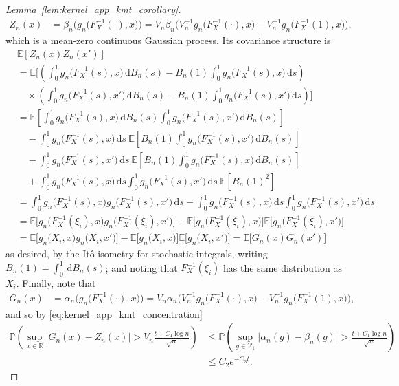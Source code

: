 \documentclass[11pt,lof]{puthesis}
\renewcommand{\P}{\ensuremath{\mathbb{P}}}
\newcommand{\R}{\ensuremath{\mathbb{R}}}
\newcommand{\E}{\ensuremath{\mathbb{E}}}
\newcommand{\cV}{\ensuremath{\mathcal{V}}}
\newcommand{\diff}[1]{\,\mathrm{d}#1}
\theoremstyle{break}
\theoremstyle{proof}
\newtheorem{proof}{Proof}
\begin{document}
\begin{proof}[Lemma~\ref{lem:kernel_app_kmt_corollary}]
\begin{align*}
Z_n(x)
&=
\beta_n \Big(g_n\big(F_X^{-1}(\cdot), x\big)\Big)
= V_n \beta_n \Big(
V_n^{-1} g_n\big(F_X^{-1}(\cdot), x\big)
- V_n^{-1} g_n\big(F_X^{-1}(1), x\big)
\Big),
\end{align*}
%
which is a mean-zero continuous Gaussian process.
Its covariance structure is
%
\begin{align*}
&\E[Z_n(x) Z_n(x')] \\
&=
\E\bigg[
\left(
\int_0^1 g_n\big(F_X^{-1}(s),x\big) \diff{B_n(s)}
- B_n(1) \int_0^1 g_n\big(F_X^{-1}(s),x\big) \diff{s}
\right) \\
&\quad\times
\left(
\int_0^1 g_n\big(F_X^{-1}(s),x'\big) \diff{B_n(s)}
- B_n(1) \int_0^1 g_n\big(F_X^{-1}(s),x'\big) \diff{s}
\right)
\bigg] \\
&=
\E\left[
\int_0^1 g_n\big(F_X^{-1}(s),x\big) \diff{B_n(s)}
\int_0^1 g_n\big(F_X^{-1}(s),x'\big) \diff{B_n(s)}
\right] \\
&\quad- \int_0^1 g_n\big(F_X^{-1}(s),x\big) \diff{s} \
\E\left[
B_n(1) \int_0^1 g_n\big(F_X^{-1}(s),x'\big) \diff{B_n(s)}
\right] \\
&\quad-
\int_0^1 g_n\big(F_X^{-1}(s),x'\big) \diff{s} \
\E\left[
B_n(1) \int_0^1 g_n\big(F_X^{-1}(s),x\big) \diff{B_n(s)}
\right] \\
&\quad+
\int_0^1 g_n\big(F_X^{-1}(s),x\big) \diff{s}
\int_0^1 g_n\big(F_X^{-1}(s),x'\big) \diff{s} \
\E\left[
B_n(1)^2
\right] \\
&=
\int_0^1 g_n\big(F_X^{-1}(s),x\big)
g_n\big(F_X^{-1}(s),x'\big) \diff{s}
- \int_0^1 g_n\big(F_X^{-1}(s),x\big) \diff{s}
\int_0^1 g_n\big(F_X^{-1}(s),x'\big) \diff{s} \\
&=
\E\Big[
g_n\big(F_X^{-1}(\xi_i), x\big)
g_n\big(F_X^{-1}(\xi_i), x'\big)
\Big]
- \E\Big[
g_n\big(F_X^{-1}(\xi_i), x\big)
\Big]
\E\Big[
g_n\big(F_X^{-1}(\xi_i), x'\big)
\Big] \\
&=
\E\Big[
g_n\big(X_i, x\big)
g_n\big(X_i, x'\big)
\Big]
- \E\Big[
g_n\big(X_i, x\big)
\Big]
\E\Big[
g_n\big(X_i, x'\big)
\Big]
=
\E\big[
G_n(x)
G_n(x')
\big]
\end{align*}
%
as desired, by the It\^o isometry for stochastic integrals,
writing $B_n(1) = \int_0^1 \diff{B_n(s)}$;
and noting that $F_X^{-1}(\xi_i)$
has the same distribution as $X_i$.
Finally, note that
%
\begin{align*}
G_n(x)
&=
\alpha_n \Big(g_n\big(F_X^{-1}(\cdot), x\big)\Big)
= V_n \alpha_n \Big(
V_n^{-1} g_n\big(F_X^{-1}(\cdot), x\big)
- V_n^{-1} g_n\big(F_X^{-1}(1), x\big)
\Big),
\end{align*}
%
and so by \eqref{eq:kernel_app_kmt_concentration}
%
\begin{align*}
\P\left(
\sup_{x \in \R}
\Big|G_n(x) - Z_n(x)\Big|
> V_n \frac{t + C_1 \log n}{\sqrt n}
\right)
&\leq
\P\left(
\sup_{g \in \cV_1}
\big|\alpha_n(g) - \beta_n(g)\big|
> \frac{t + C_1\log n}{\sqrt{n}}
\right) \\
&\leq C_2 e^{-C_3 t}.
\end{align*}
\end{proof}
\end{document}
